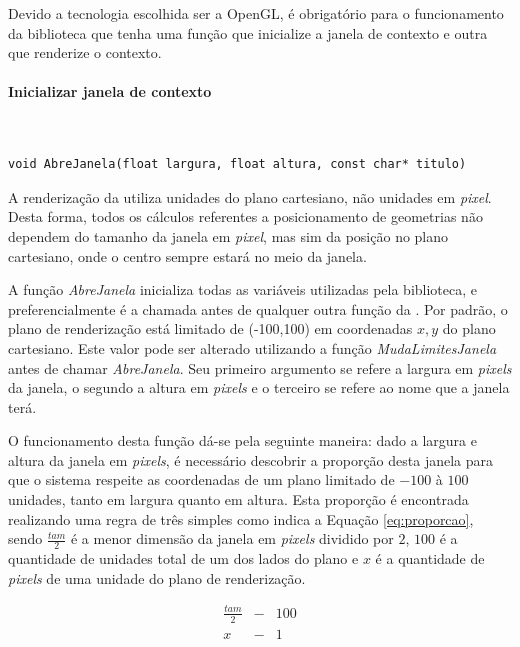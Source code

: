 Devido a tecnologia escolhida ser a OpenGL, é obrigatório para o funcionamento da biblioteca que tenha uma função que inicialize a janela de contexto e outra que renderize o contexto.

 \paragraph{Inicializar janela de contexto}\mbox{}\\

 
\begin{lstlisting}
void AbreJanela(float largura, float altura, const char* titulo)
\end{lstlisting}

A renderização da \playAPC{} utiliza unidades do plano cartesiano, não unidades em \emph{pixel}. Desta forma, todos os cálculos referentes a posicionamento de geometrias não dependem do tamanho da janela em \emph{pixel}, mas sim da posição no plano cartesiano, onde o centro sempre estará no meio da janela.

A função \emph{AbreJanela} inicializa todas as variáveis utilizadas pela biblioteca, e preferencialmente é a chamada antes de qualquer outra função da \playAPC{}. Por padrão, o plano de renderização está limitado de (-100,100) em coordenadas $x,y$ do plano cartesiano. Este valor pode ser alterado utilizando a função \emph{MudaLimitesJanela} antes de chamar \emph{AbreJanela}.
Seu primeiro argumento se refere a largura em \emph{pixels} da janela, o segundo a altura em \emph{pixels} e o terceiro se refere ao nome que a janela terá.

O funcionamento desta função dá-se pela seguinte maneira: dado a largura e altura da janela em \emph{pixels}, é necessário descobrir a proporção desta janela para que o sistema respeite as coordenadas de um plano limitado de $-100$ à $100$ unidades, tanto em largura quanto em altura. Esta proporção é encontrada realizando uma regra de três simples como indica a Equação \ref{eq:proporcao}, sendo $\frac{tam}{2}$ é a menor dimensão da janela em \emph{pixels} dividido por $2$, $100$ é a quantidade de unidades total de um dos lados do plano e $x$ é a quantidade de \emph{pixels} de uma unidade do plano de renderização.

\begin{equation} \label{eq:proporcao}
  \begin{matrix}
    \frac{tam}{2}  & - & 100 \\
    x & - & 1 \\
  \end{matrix}
\end{equation}

